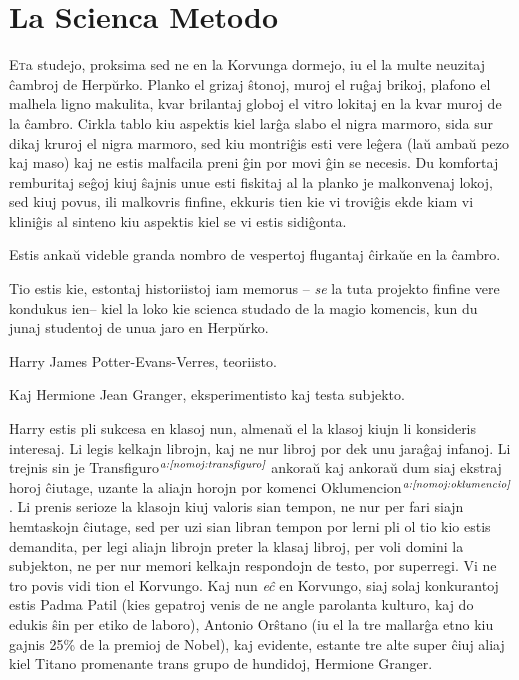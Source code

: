 \chapter{La Scienca Metodo}

\lettrine{E}ta studejo, proksima sed ne en la Korvunga dormejo, iu el
la multe neuzitaj ĉambroj de Herpŭrko. Planko el grizaj ŝtonoj, muroj
el ruĝaj brikoj, plafono el malhela ligno makulita, kvar brilantaj
globoj el vitro lokitaj en la kvar muroj de la ĉambro. Cirkla tablo
kiu aspektis kiel larĝa slabo el nigra marmoro, sida sur dikaj kruroj
el nigra marmoro, sed kiu montriĝis esti vere leĝera (laŭ ambaŭ pezo
kaj maso) kaj ne estis malfacila preni ĝin por movi ĝin se necesis. Du
komfortaj remburitaj seĝoj kiuj ŝajnis unue esti fiskitaj al la planko
je malkonvenaj lokoj, sed kiuj povus, ili malkovris finfine, ekkuris
tien kie vi troviĝis ekde kiam vi kliniĝis al sinteno kiu aspektis
kiel se vi estis sidiĝonta.


Estis ankaŭ videble granda nombro de vespertoj flugantaj ĉirkaŭe en la
ĉambro.

Tio estis kie, estontaj historiistoj iam memorus -- \emph{se} la tuta
projekto finfine vere kondukus ien-- kiel la loko kie scienca studado
de la magio komencis, kun du junaj studentoj de unua jaro en Herpŭrko.

Harry James Potter-Evans-Verres, teoriisto.

Kaj Hermione Jean Granger, eksperimentisto kaj testa subjekto.

Harry estis pli sukcesa en klasoj nun, almenaŭ el la klasoj kiujn li
konsideris interesaj. Li legis kelkajn librojn, kaj ne nur libroj por
dek unu jaraĝaj infanoj. Li trejnis sin je
Transfiguro$^{\textit{a:\ref{nomoj:transfiguro}}}$ ankoraŭ kaj ankoraŭ
dum siaj ekstraj horoj ĉiutage, uzante la aliajn horojn por komenci
Oklumencion$^{\textit{a:\ref{nomoj:oklumencio}}}$. Li prenis serioze
la klasojn kiuj valoris sian tempon, ne nur per fari siajn hemtaskojn
ĉiutage, sed per uzi sian libran tempon por lerni pli ol tio kio estis
demandita, per legi aliajn librojn preter la klasaj libroj, per voli
domini la subjekton, ne per nur memori kelkajn respondojn de testo,
por superregi. Vi ne tro povis vidi tion el Korvungo. Kaj nun
\emph{eĉ} en Korvungo, siaj solaj konkurantoj estis Padma Patil (kies
gepatroj venis de ne angle parolanta kulturo, kaj do edukis ŝin per
etiko de laboro), Antonio Orŝtano (iu el la tre mallarĝa etno kiu
gajnis 25\% de la premioj de Nobel), kaj evidente, estante tre alte
super ĉiuj aliaj kiel Titano promenante trans grupo de hundidoj,
Hermione Granger.

